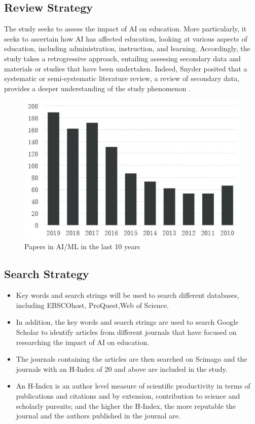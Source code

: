 \documentclass[conference]{IEEEtran}
\begin{document}
\subsection{Review Strategy}\label{AA}
The study seeks to assess the impact of AI on education. More particularly, it seeks to ascertain how AI has affected education, looking at various aspects of education, including administration, instruction, and learning. Accordingly, the study takes a retrogressive approach, entailing assessing secondary data and materials or studies that have been undertaken. Indeed, Snyder posited that a systematic or semi-systematic literature review, a review of secondary data, provides a deeper understanding of the study phenomenon \cite{b1}.
\vspace{-5mm}
\begin{center}
\begin{figure}[h]
\caption{Papers in AI/ML in the last 10 years}
\vspace{5 mm}
\includegraphics[width=9 cm]{graph1}
\end{figure}
\end{center}

\subsection{Search Strategy}
\begin{itemize}
\item Key words and search strings will be used to search different databases, including EBSCOhost, ProQuest,Web of Science.
\item In addition, the key words and search strings are used to search Google Scholar to identify articles from different journals that have focused on researching the impact of AI on education.
\item The journals containing the articles are then searched on Scimago and the journals with an H-Index of 20 and above are included in the study.
\item An H-Index is an author level measure of scientific productivity in terms of publications and citations and by extension, contribution to science and scholarly pursuits; and the higher the H-Index, the more reputable the journal and the authors published in the journal are.
\end{itemize}
\end{document}
